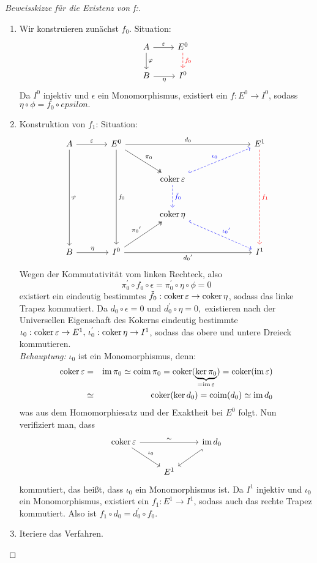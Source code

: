 \begin{proof}[Beweisskizze für die Existenz von f:] 
	\begin{enumerate}
		\item Wir konstruieren zunächst $f_0$. Situation: 
		$$\begin{tikzcd}
		 A \arrow{d}{\phi} \arrow{r}{\epsilon}& E^0 \arrow[dashed,red]{d}{f_0} \\
		 B \arrow[swap]{r}{\eta} & I^0 
		\end{tikzcd}$$
		Da $I^{0} $ injektiv und $\epsilon $ ein Monomorphismus, existiert ein $f: E^{0} \to I^{0} $, sodass $\eta \circ \phi = f_0 \circ epsilon.$
		\item Konstruktion von $f_1$: Situation: \\
		$$\begin{tikzcd}[row sep = large, column sep = large]
		A \arrow{ddd}{\phi} \arrow{r}{\epsilon} & E^0 \arrow{ddd}{f_0}\arrow[two heads]{dr}{\pi_0}\arrow{rrr}{d_0} & & & E^1\arrow[red, dashed]{ddd}{f_1} \\
		& & \coker \epsilon\arrow[dashed, blue]{d}{\tilde{f}_0} \arrow[blue, dashed, hook]{urr}{\iota_0}\\
		& & \coker \eta\arrow[dashed, blue, hook]{drr}{{\iota_0}'} & & \\
		B\arrow{r}{\eta} & I^0\arrow[two heads]{ur}{{\pi_0}'}\arrow[swap]{rrr}{{d_0}'} & & &I^1
		\end{tikzcd}$$
		Wegen der Kommutativität vom linken Rechteck, also
		$$ \pi_0^{'} \circ f_0 \circ \epsilon = \pi_0^{'} \circ \eta \circ \phi = 0 $$ existiert ein eindeutig bestimmtes $ \tilde{f}_0: \operatorname{coker}\varepsilon \to \operatorname{coker} \eta$, sodass das linke Trapez kommutiert. Da $ d_0 \circ \epsilon = 0$ und $ d_0^{'} \circ \eta = 0, $ existieren nach der Universellen Eigenschaft des Kokerns eindeutig bestimmte $ \iota_0: \operatorname{coker}\varepsilon \to E^{1}, \, \iota_0^{'}: \operatorname{coker} \eta \to I^{1}$, sodass das obere und untere Dreieck kommutieren.\\ \emph{Behauptung:} $\iota_0$ ist ein Monomorphismus, denn: \begin{eqnarray*}
			\operatorname{coker} \varepsilon &=& \operatorname{im} \pi_0 \simeq \operatorname{coim} \pi_0 = \operatorname{coker}(\underbrace{\ker \pi_0}_{=\operatorname{im} \varepsilon}) = \operatorname{coker}(\operatorname{im}\varepsilon)\\ &\simeq& \operatorname{coker}(\ker d_0)
		 =\operatorname{coim}(d_0) \simeq \operatorname{im} d_0
		\end{eqnarray*}
		was aus dem Homomorphiesatz und der Exaktheit bei $E^{0}$ folgt. Nun verifiziert man, dass 
		$$\begin{tikzcd}
		 \coker \epsilon \arrow{rr}{\sim} \arrow{dr}{\iota_0} && \im d_0 \arrow[hook]{dl}\\
		 & E^1 &
		\end{tikzcd}$$
		kommutiert, das heißt, dass $\iota_0$ ein Monomorphismus ist. Da $I^1 $ injektiv und $\iota_0$ ein Monomorphismus, existiert ein $f_1: E^1 \to I^1$, sodass auch das rechte Trapez kommutiert. Also ist $f_1 \circ d_0 = d_0^{'} \circ f_0 $. 
		\item Iteriere das Verfahren.
	\end{enumerate}
\end{proof}
